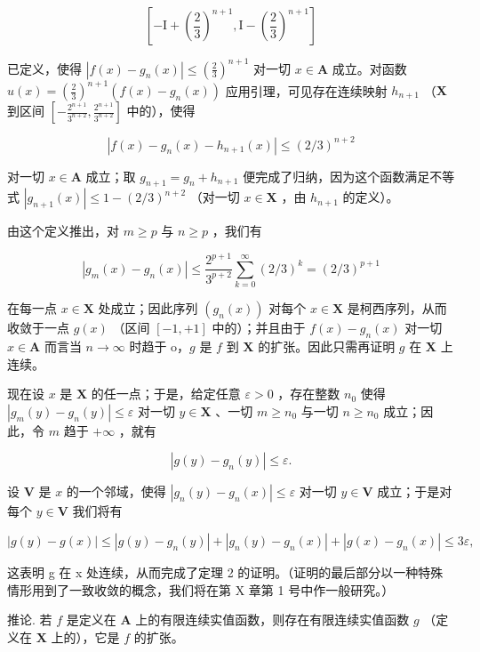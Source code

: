 \[
[ - \mathrm{I} + (\frac {2}{3}) ^ {n + 1}, \mathrm{I} - (\frac {2}{3}) ^ {n + 1} ]
\]

已定义，使得 \(|f(x) - g_n(x)| \leqslant (\frac{2}{3})^{n+1}\) 对一切 \(x \in \mathbf{A}\) 成立。对函数 \(u(x) = (\frac{2}{3})^{n+1} (f(x) - g_n(x))\) 应用引理，可见存在连续映射 \(h_{n+1}\) （\(\mathbf{X}\) 到区间 \(\left[-\frac{2^{n+1}}{3^{n+2}}, \frac{2^{n+1}}{3^{n+2}}\right]\) 中的），使得

\[
\left| f (x) - g _ {n} (x) - h _ {n + 1} (x) \right| \leqslant (2 / 3) ^ {n + 2}
\]

对一切 \(x \in \mathbf{A}\) 成立；取 \(g_{n+1} = g_n + h_{n+1}\) 便完成了归纳，因为这个函数满足不等式 \(|g_{n+1}(x)| \leqslant 1 - (2/3)^{n+2}\) （对一切 \(x \in \mathbf{X}\) ，由 \(h_{n+1}\) 的定义）。

由这个定义推出，对 \(m \geqslant p\) 与 \(n \geqslant p\) ，我们有

\[
\left| g _ {m} (x) - g _ {n} (x) \right| \leqslant \frac {2 ^ {p + 1}}{3 ^ {p + 2}} \sum_ {k = 0} ^ {\infty} (2 / 3) ^ {k} = (2 / 3) ^ {p + 1}
\]

在每一点 \(x \in \mathbf{X}\) 处成立；因此序列 \((g_n(x))\) 对每个 \(x \in \mathbf{X}\) 是柯西序列，从而收敛于一点 \(g(x)\) （区间 \([-1, +1]\) 中的）；并且由于 \(f(x) - g_n(x)\) 对一切 \(x \in \mathbf{A}\) 而言当 \(n \to \infty\) 时趋于 o，\(g\) 是 \(f\) 到 \(\mathbf{X}\) 的扩张。因此只需再证明 \(g\) 在 \(\mathbf{X}\) 上连续。

现在设 \(x\) 是 \(\mathbf{X}\) 的任一点；于是，给定任意 \(\varepsilon > 0\) ，存在整数 \(n_0\) 使得 \(|g_m(y) - g_n(y)| \leqslant \varepsilon\) 对一切 \(y \in \mathbf{X}\) 、一切 \(m \geqslant n_0\) 与一切 \(n \geqslant n_0\) 成立；因此，令 \(m\) 趋于 \(+\infty\) ，就有

\[
\left| g (y) - g _ {n} (y) \right| \leqslant \varepsilon .
\]

设 \(\mathbf{V}\) 是 \(x\) 的一个邻域，使得 \(|g_n(y) - g_n(x)| \leqslant \varepsilon\) 对一切 \(y \in \mathbf{V}\) 成立；于是对每个 \(y \in \mathbf{V}\) 我们将有

\[
\left| g (y) - g (x) \right| \leqslant \left| g (y) - g _ {n} (y) \right| + \left| g _ {n} (y) - g _ {n} (x) \right| + \left| g (x) - g _ {n} (x) \right| \leqslant 3 \varepsilon ,
\]

这表明 g 在 x 处连续，从而完成了定理 2 的证明。（证明的最后部分以一种特殊情形用到了一致收敛的概念，我们将在第 X 章第 1 号中作一般研究。）

推论. 若 \(f\) 是定义在 \(\mathbf{A}\) 上的有限连续实值函数，则存在有限连续实值函数 \(g\) （定义在 \(\mathbf{X}\) 上的），它是 \(f\) 的扩张。

